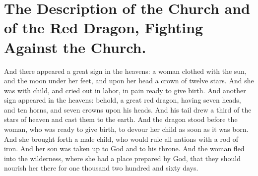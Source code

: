 \chapter[Sermon 52. The Description of the Church and of the Red Dragon, Fighting Against the Church.]{The Description of the Church and of the Red Dragon, Fighting Against the Church.}
\label{sermon:052}

And there appeared a great sign in the heavens: a woman clothed with the sun, and the moon under her feet, and upon her head a crown of twelve stars. And she was with child, and cried out in labor, in pain ready to give birth. And another sign appeared in the heavens: behold, a great red dragon, having seven heads, and ten horns, and seven crowns upon his heads. And his tail drew a third of the stars of heaven and cast them to the earth. And the dragon stood before the woman, who was ready to give birth, to devour her child as soon as it was born. And she brought forth a male child, who would rule all nations with a rod of iron. And her son was taken up to God and to his throne. And the woman fled into the wilderness, where she had a place prepared by God, that they should nourish her there for one thousand two hundred and sixty days.

